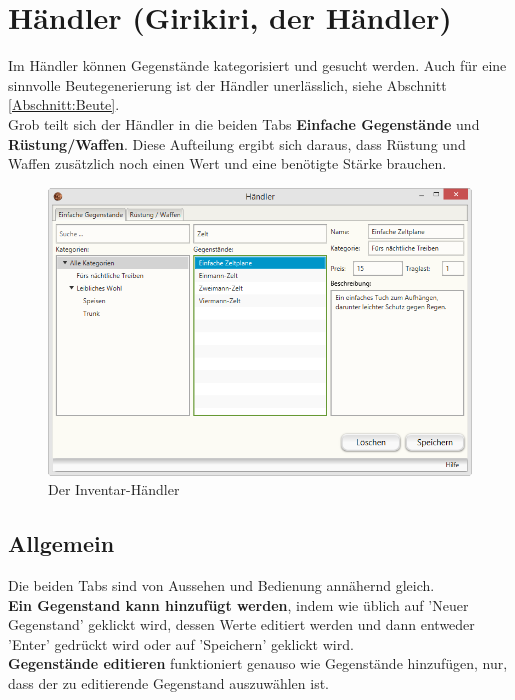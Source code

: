 \documentclass[11pt, a4paper, german]{article}
\begin{document}
\clearpage
\section{Händler (Girikiri, der Händler)}\label{Abschnitt:Haendler}
Im Händler können Gegenstände kategorisiert und gesucht werden. Auch für eine sinnvolle Beutegenerierung ist der Händler unerlässlich, siehe Abschnitt \ref{Abschnitt:Beute}.\\
Grob teilt sich der Händler in die beiden Tabs \textbf{Einfache Gegenstände} und \textbf{Rüstung/Waffen}.
Diese Aufteilung ergibt sich daraus, dass Rüstung und Waffen zusätzlich noch einen Wert und eine benötigte Stärke brauchen.
\begin{figure}
\centering
\includegraphics[width=1\linewidth]{Bilder/InventarHaendler.png}
\caption{Der Inventar-Händler}
\label{fig:Inventarhaendler}
\end{figure}
\subsection{Allgemein}
Die beiden Tabs sind von Aussehen und Bedienung annähernd gleich.\\

\textbf{Ein Gegenstand kann hinzufügt werden}, indem wie üblich auf 'Neuer Gegenstand' geklickt wird, dessen Werte editiert werden und dann entweder 'Enter' gedrückt wird oder auf 'Speichern' geklickt wird. \\

\textbf{Gegenstände editieren} funktioniert genauso wie Gegenstände hinzufügen, nur, dass der zu editierende Gegenstand auszuwählen ist.\\
\end{document}
